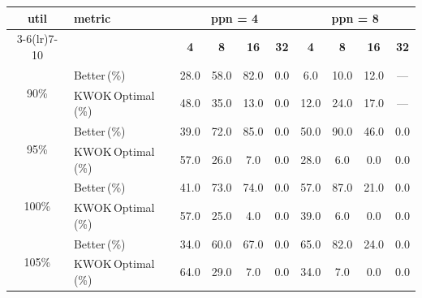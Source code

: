 \begin{tabular}{@{}c l *{8}{c}@{}}
\toprule
\multirow{2}{*}{\textbf{util}} & \multirow{2}{*}{\textbf{metric}} &\multicolumn{4}{c}{\textbf{ppn = 4}} & \multicolumn{4}{c}{\textbf{ppn = 8}}\\
\cmidrule(lr){3-6}\cmidrule(lr){7-10}
 &  & \textbf{4} & \textbf{8} & \textbf{16} & \textbf{32} & \textbf{4} & \textbf{8} & \textbf{16} & \textbf{32}\\
\midrule
\multirow{2}{*}{90\%}
& Better\,(\%) & 28.0 & 58.0 & 82.0 & 0.0 & 6.0 & 10.0 & 12.0 & \multicolumn{1}{c}{—} \\
& KWOK\,Optimal\,(\%) & 48.0 & 35.0 & 13.0 & 0.0 & 12.0 & 24.0 & 17.0 & \multicolumn{1}{c}{—} \\
\midrule
\multirow{2}{*}{95\%}
& Better\,(\%) & 39.0 & 72.0 & 85.0 & 0.0 & 50.0 & 90.0 & 46.0 & 0.0 \\
& KWOK\,Optimal\,(\%) & 57.0 & 26.0 & 7.0 & 0.0 & 28.0 & 6.0 & 0.0 & 0.0 \\
\midrule
\multirow{2}{*}{100\%}
& Better\,(\%) & 41.0 & 73.0 & 74.0 & 0.0 & 57.0 & 87.0 & 21.0 & 0.0 \\
& KWOK\,Optimal\,(\%) & 57.0 & 25.0 & 4.0 & 0.0 & 39.0 & 6.0 & 0.0 & 0.0 \\
\midrule
\multirow{2}{*}{105\%}
& Better\,(\%) & 34.0 & 60.0 & 67.0 & 0.0 & 65.0 & 82.0 & 24.0 & 0.0 \\
& KWOK\,Optimal\,(\%) & 64.0 & 29.0 & 7.0 & 0.0 & 34.0 & 7.0 & 0.0 & 0.0 \\
\bottomrule
\end{tabular}
